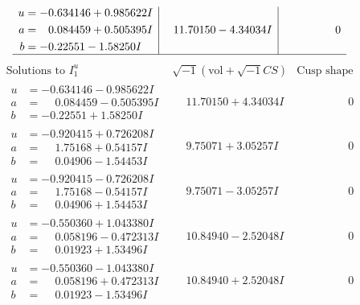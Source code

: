\documentclass[1p]{elsarticle_modified}
\theoremstyle{definition}
\newcommand{\I}{\sqrt{-1}}
\begin{document}
$$\begin{array}{c|c|c}
\begin{aligned}
u &= -0.634146 + 0.985622 I \\
a &= \phantom{-}0.084459 + 0.505395 I \\
b &= -0.22551 - 1.58250 I\end{aligned}
 & \phantom{-}11.70150 - 4.34034 I & \phantom{-0.000000 } 0\\
 \hline 
 \end{array}$$\newpage$$\begin{array}{c|c|c}  
\text{Solutions to }I^u_{1}& \I (\text{vol} + \sqrt{-1}CS) & \text{Cusp shape}\\
 \hline 
\begin{aligned}
u &= -0.634146 - 0.985622 I \\
a &= \phantom{-}0.084459 - 0.505395 I \\
b &= -0.22551 + 1.58250 I\end{aligned}
 & \phantom{-}11.70150 + 4.34034 I & \phantom{-0.000000 } 0 \\ \hline\begin{aligned}
u &= -0.920415 + 0.726208 I \\
a &= \phantom{-}1.75168 + 0.54157 I \\
b &= \phantom{-}0.04906 - 1.54453 I\end{aligned}
 & \phantom{-}9.75071 + 3.05257 I & \phantom{-0.000000 } 0 \\ \hline\begin{aligned}
u &= -0.920415 - 0.726208 I \\
a &= \phantom{-}1.75168 - 0.54157 I \\
b &= \phantom{-}0.04906 + 1.54453 I\end{aligned}
 & \phantom{-}9.75071 - 3.05257 I & \phantom{-0.000000 } 0 \\ \hline\begin{aligned}
u &= -0.550360 + 1.043380 I \\
a &= \phantom{-}0.058196 - 0.472313 I \\
b &= \phantom{-}0.01923 + 1.53496 I\end{aligned}
 & \phantom{-}10.84940 - 2.52048 I & \phantom{-0.000000 } 0 \\ \hline\begin{aligned}
u &= -0.550360 - 1.043380 I \\
a &= \phantom{-}0.058196 + 0.472313 I \\
b &= \phantom{-}0.01923 - 1.53496 I\end{aligned}
 & \phantom{-}10.84940 + 2.52048 I & \phantom{-0.000000 } 0 \\ \hline\begin{aligned}

\end{aligned}
\end{array}$$
\end{document}
